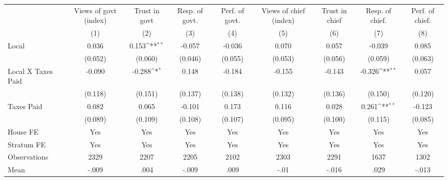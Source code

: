 {
\def\sym#1{\ifmmode^{#1}\else\(^{#1}\)\fi}
\begin{tabular}{l*{8}{c}}
\hline\hline
                &\multicolumn{1}{c}{Views of govt (index)}&\multicolumn{1}{c}{Trust in govt}&\multicolumn{1}{c}{Resp. of govt.}&\multicolumn{1}{c}{Perf. of govt.}&\multicolumn{1}{c}{Views of chief (index)}&\multicolumn{1}{c}{Trust in chief}&\multicolumn{1}{c}{Resp. of chief.}&\multicolumn{1}{c}{Perf. of chief.}\\
                &\multicolumn{1}{c}{(1)}         &\multicolumn{1}{c}{(2)}         &\multicolumn{1}{c}{(3)}         &\multicolumn{1}{c}{(4)}         &\multicolumn{1}{c}{(5)}         &\multicolumn{1}{c}{(6)}         &\multicolumn{1}{c}{(7)}         &\multicolumn{1}{c}{(8)}         \\
\hline
Local           &    0.036         &    0.153\sym{**} &   -0.057         &   -0.036         &    0.070         &    0.057         &   -0.039         &    0.085         \\
                &  (0.052)         &  (0.060)         &  (0.046)         &  (0.055)         &  (0.053)         &  (0.056)         &  (0.059)         &  (0.063)         \\
Local X Taxes Paid&   -0.090         &   -0.288\sym{*}  &    0.148         &   -0.184         &   -0.155         &   -0.143         &   -0.326\sym{**} &    0.057         \\
                &  (0.118)         &  (0.151)         &  (0.137)         &  (0.138)         &  (0.132)         &  (0.136)         &  (0.150)         &  (0.120)         \\
Taxes Paid      &    0.082         &    0.065         &   -0.101         &    0.173         &    0.116         &    0.028         &    0.261\sym{**} &   -0.123         \\
                &  (0.089)         &  (0.109)         &  (0.108)         &  (0.107)         &  (0.095)         &  (0.100)         &  (0.115)         &  (0.085)         \\
House FE        &      Yes         &      Yes         &      Yes         &      Yes         &      Yes         &      Yes         &      Yes         &      Yes         \\
Stratum FE      &      Yes         &      Yes         &      Yes         &      Yes         &      Yes         &      Yes         &      Yes         &      Yes         \\
\hline
Observations    &     2329         &     2207         &     2205         &     2102         &     2303         &     2291         &     1637         &     1302         \\
Mean            &    -.009         &     .004         &    -.009         &     .009         &     -.01         &    -.016         &     .029         &    -.013         \\
\hline\hline
\end{tabular}
}
